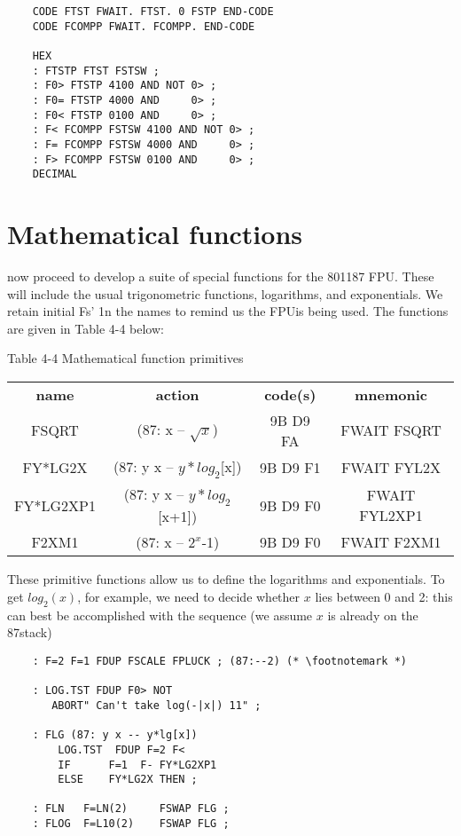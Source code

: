 \begin{lstlisting}
    CODE FTST FWAIT. FTST. 0 FSTP END-CODE
    CODE FCOMPP FWAIT. FCOMPP. END-CODE

    HEX
    : FTSTP FTST FSTSW ;
    : F0> FTSTP 4100 AND NOT 0> ;
    : F0= FTSTP 4000 AND     0> ;
    : F0< FTSTP 0100 AND     0> ;
    : F< FCOMPP FSTSW 4100 AND NOT 0> ;
    : F= FCOMPP FSTSW 4000 AND     0> ;
    : F> FCOMPP FSTSW 0100 AND     0> ;
    DECIMAL
\end{lstlisting}

\section{Mathematical functions}

 now proceed to develop a suite of special functions for the 801187 FPU. These will include the usual trigonometric functions, logarithms, and exponentials. We retain initial Fs' 1n the names to remind us the FPUis being used. The functions are given in Table 4-4 below:

Table 4-4 Mathematical function primitives

\begin{center}
    \begin{tabular}{|c c c c|}
        \hline
        \textbf{name}   &   \textbf{action}               & \textbf{code(s)}  & \textbf{mnemonic} \\
        FSQRT           &   (87:   x -- $\sqrt{x}$)       & 9B D9 FA          & FWAIT FSQRT       \\
        FY*LG2X         &   (87: y x -- $y*log_{2}$[x])   & 9B D9 F1          & FWAIT FYL2X       \\
        FY*LG2XP1       &   (87: y x -- $y*log_{2}$[x+1]) & 9B D9 F0          & FWAIT FYL2XP1     \\
        F2XM1           &   (87:   x -- $2^{x}$-1)        & 9B D9 F0          & FWAIT F2XM1       \\
        \hline
    \end{tabular}
\end{center}

These primitive functions allow us to define the logarithms and exponentials. To get $log_{2}(x)$, for example, we need to decide whether $x$ lies between 0 and 2: this can best be accomplished with
the sequence (we assume $x$ is already on the 87stack)

\begin{lstlisting}
    : F=2 F=1 FDUP FSCALE FPLUCK ; (87:--2) (* \footnotemark *)

    : LOG.TST FDUP F0> NOT
       ABORT" Can't take log(-|x|) 11" ;

    : FLG (87: y x -- y*lg[x])
        LOG.TST  FDUP F=2 F<
        IF      F=1  F- FY*LG2XP1
        ELSE    FY*LG2X THEN ;

    : FLN   F=LN(2)     FSWAP FLG ;
    : FLOG  F=L10(2)    FSWAP FLG ;
\end{lstlisting}

